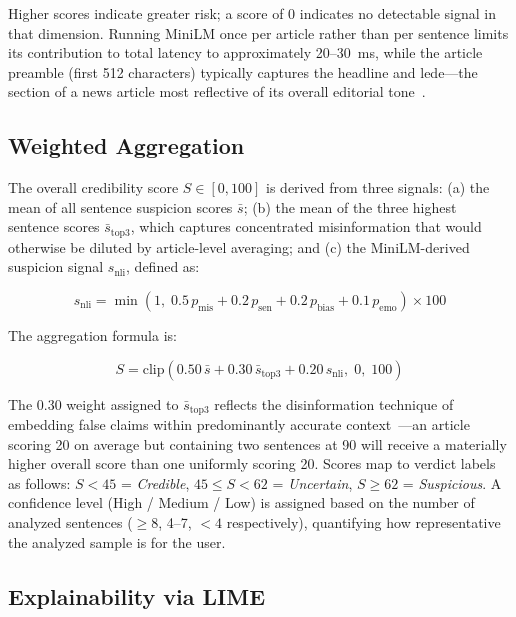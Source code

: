 \documentclass[journal]{IEEEtran}
\begin{document}
Higher scores indicate greater risk; a score of 0 indicates no detectable signal in that
dimension. Running MiniLM once per article rather than per sentence limits its contribution
to total latency to approximately 20--30~ms, while the article preamble (first 512 characters)
typically captures the headline and lede—the section of a news article most reflective of
its overall editorial tone~\cite{rashkin2017truth}.

\subsection{Weighted Aggregation}

The overall credibility score $S \in [0, 100]$ is derived from three signals: (a) the mean
of all sentence suspicion scores $\bar{s}$; (b) the mean of the three highest sentence
scores $\bar{s}_\text{top3}$, which captures concentrated misinformation that would otherwise
be diluted by article-level averaging; and (c) the MiniLM-derived suspicion signal
$s_\text{nli}$, defined as:

\begin{equation}
s_\text{nli} = \min\!\left(1,\; 0.5\,p_\text{mis} + 0.2\,p_\text{sen} + 0.2\,p_\text{bias}
+ 0.1\,p_\text{emo}\right) \times 100
\label{eq:nli}
\end{equation}

The aggregation formula is:

\begin{equation}
S = \text{clip}\!\left(0.50\,\bar{s} + 0.30\,\bar{s}_\text{top3} + 0.20\,s_\text{nli},\;
0,\; 100\right)
\label{eq:agg}
\end{equation}

The 0.30 weight assigned to $\bar{s}_\text{top3}$ reflects the disinformation technique of
embedding false claims within predominantly accurate context~\cite{zhou2020survey}—an
article scoring 20 on average but containing two sentences at 90 will receive a materially
higher overall score than one uniformly scoring 20. Scores map to verdict labels as follows:
$S < 45$ = \textit{Credible}, $45 \leq S < 62$ = \textit{Uncertain}, $S \geq 62$ =
\textit{Suspicious}. A confidence level (High / Medium / Low) is assigned based on the
number of analyzed sentences ($\geq 8$, 4--7, $< 4$ respectively), quantifying how
representative the analyzed sample is for the user.

\subsection{Explainability via LIME}
\end{document}
